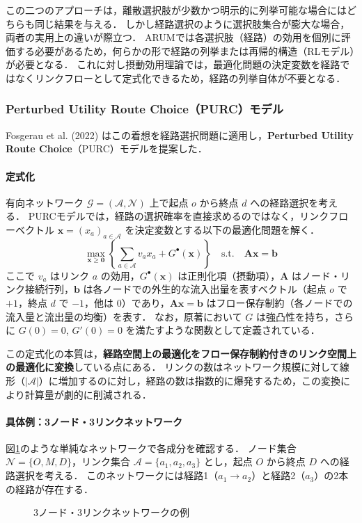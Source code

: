 この二つのアプローチは，離散選択肢が少数かつ明示的に列挙可能な場合にはどちらも同じ結果を与える．
しかし経路選択のように選択肢集合が膨大な場合，両者の実用上の違いが際立つ．
ARUMでは各選択肢（経路）の効用を個別に評価する必要があるため，何らかの形で経路の列挙または再帰的構造（RLモデル）が必要となる．
これに対し摂動効用理論では，最適化問題の決定変数を経路ではなくリンクフローとして定式化できるため，経路の列挙自体が不要となる．

\subsubsection{Perturbed Utility Route Choice（PURC）モデル}
Fosgerau et al. (2022) \cite{fosgerau2022perturbed}はこの着想を経路選択問題に適用し，\textbf{Perturbed Utility Route Choice}（PURC）モデルを提案した．

\paragraph{定式化}
有向ネットワーク $\mathcal{G} = (\mathcal{A}, \mathcal{N})$ 上で起点 $o$ から終点 $d$ への経路選択を考える．
PURCモデルでは，経路の選択確率を直接求めるのではなく，リンクフローベクトル $\bm{x} = (x_a)_{a \in \mathcal{A}}$ を決定変数とする以下の最適化問題を解く．
\begin{equation}\label{eq:purc}
  \max_{\bm{x} \geq \bm{0}} \left\{ \sum_{a \in \mathcal{A}} v_a x_a + G^\bullet(\bm{x}) \right\} \quad \text{s.t.} \quad \bm{A}\bm{x} = \bm{b}
\end{equation}
ここで $v_a$ はリンク $a$ の効用，$G^\bullet(\bm{x})$ は正則化項（摂動項），$\bm{A}$ はノード・リンク接続行列，$\bm{b}$ は各ノードでの外生的な流入出量を表すベクトル（起点 $o$ で $+1$，終点 $d$ で $-1$，他は $0$）であり，$\bm{A}\bm{x} = \bm{b}$ はフロー保存制約（各ノードでの流入量と流出量の均衡）を表す．
なお，原著\cite{fosgerau2022perturbed}において $G$ は強凸性を持ち，さらに $G(0) = 0$, $G'(0) = 0$ を満たすような関数として定義されている．

この定式化の本質は，\textbf{経路空間上の最適化をフロー保存制約付きのリンク空間上の最適化に変換}している点にある．
リンクの数はネットワーク規模に対して線形（$|\mathcal{A}|$）に増加するのに対し，経路の数は指数的に爆発するため，この変換により計算量が劇的に削減される．

\paragraph{具体例：3ノード・3リンクネットワーク}
図\ref{fig:purc_network}のような単純なネットワークで各成分を確認する．
ノード集合 $\mathcal{N} = \{O, M, D\}$，リンク集合 $\mathcal{A} = \{a_1, a_2, a_3\}$ とし，起点 $O$ から終点 $D$ への経路選択を考える．
このネットワークには経路1（$a_1 \to a_2$）と経路2（$a_3$）の2本の経路が存在する．
\begin{figure}[t]
  \centering
  \resizebox{.55\linewidth}{!}{}
  \caption{3ノード・3リンクネットワークの例}
  \label{fig:purc_network}
\end{figure}

